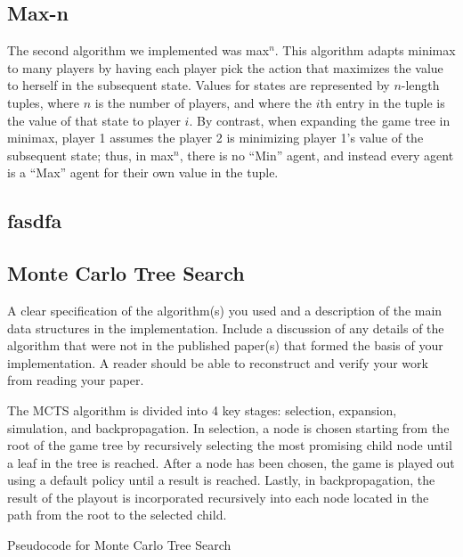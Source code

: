 \documentclass[11pt]{article}
\begin{document}
\subsection{Max-n}

The second algorithm we implemented was max$^n$. This algorithm adapts minimax to many players by having each player pick the action that maximizes the value to herself in the subsequent state. Values for states are represented by $n$-length tuples, where $n$ is the number of players, and where the $i$th entry in the tuple is the value of that state to player $i$. By contrast, when expanding the game tree in minimax, player 1 assumes the player 2 is minimizing player 1's value of the subsequent state; thus, in max$^n$, there is no ``Min'' agent, and instead every agent is a ``Max'' agent for their own value in the tuple.

\subsection{fasdfa}

\subsection{Monte Carlo Tree Search}

A clear specification of the algorithm(s) you used and a description
of the main data structures in the implementation. Include a
discussion of any details of the algorithm that were not in the
published paper(s) that formed the basis of your implementation. A
reader should be able to reconstruct and verify your work from reading
your paper.


The MCTS algorithm is divided into 4 key stages: selection, expansion, simulation, and backpropagation. In selection, a node is chosen starting from the root of the game tree by recursively selecting the most promising child node until a leaf in the tree is reached. After a node has been chosen, the game is played out using a default policy until a result is reached. Lastly, in backpropagation, the result of the playout is incorporated recursively into each node located in the path from the root to the selected child.\\

\begin{algorithm}
  \begin{algorithmic}
	\EndWhile{}
    \EndProcedure{}
  \end{algorithmic}
  \caption{Pseudocode for Monte Carlo Tree Search}
\end{algorithm}
\end{document}
